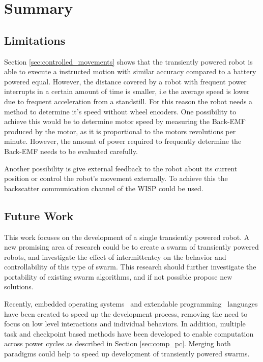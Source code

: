 \chapter{Summary}
\label{chp:summary}

\section{Limitations}


Section \ref{sec:controlled_movements} shows that the transiently powered robot is able to execute a instructed motion with similar accuracy compared to a battery powered equal.
However, the distance covered by a robot with frequent power interrupts in a certain amount of time is smaller, i.e the average speed is lower due to frequent acceleration from a standstill.
For this reason the robot needs a method to determine it's speed without wheel encoders.
One possibility to achieve this would be to determine motor speed by measuring the Back-EMF produced by the motor, as it is proportional to the motors revolutions per minute. %
However, the amount of power required to frequently determine the Back-EMF needs to be evaluated carefully.

Another possibility is give external feedback to the robot about its current position or control the robot's movement externally.
To achieve this the backscatter communication channel of the WISP could be used.

\section{Future Work}

This work focuses on the development of a single transiently powered robot.
A new promising area of research could be to create a swarm of transiently powered robots, and investigate the effect of intermittentcy on the behavior and controllability of this type of swarm.
This research should further investigate the portability of existing swarm algorithms, and if not possible propose new solutions.	

Recently, embedded operating systems~\cite{trenkwalder_iros_2016} and extendable programming~\cite{pinciroli_iros_2016} languages have been created to speed up the development process, removing the need to focus on low level interactions and individual behaviors.
In addition, multiple task and checkpoint based methods have been developed to enable computation across power cycles as described in Section \ref{sec:comp_pc}.
Merging both paradigms could help to speed up development of transiently powered swarms.

